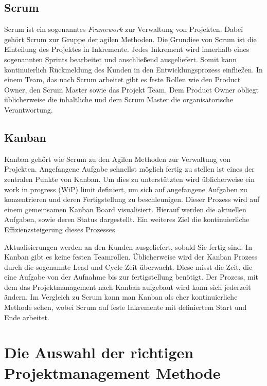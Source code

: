 \documentclass[twocolumn,10pt]{asme2ej}
\begin{document}
\subsection{Scrum}
Scrum ist ein sogenanntes \emph{Framework} zur Verwaltung von Projekten. Dabei gehört Scrum zur Gruppe der agilen Methoden. Die Grundiee von Scrum ist die Einteilung des Projektes in Inkremente. Jedes Inkrement wird innerhalb eines sogenannten Sprints bearbeitet und anschließend ausgeliefert. Somit kann kontinuierlich Rückmeldung des Kunden in den Entwicklungsprozess einfließen. In einem Team, das nach Scrum arbeitet gibt es feste Rollen wie den Product Owner, den Scrum Master sowie das Projekt Team. Dem Product Owner obliegt üblicherweise die inhaltliche und dem Scrum Master die organisatorische Verantwortung.

\subsection{Kanban}
Kanban gehört wie Scrum zu den Agilen Methoden zur Verwaltung von Projekten. Angefangene Aufgabe schnellst möglich fertig zu stellen ist eines der zentralen Punkte von Kanban. Um dies zu unterstützten wird üblicherweise ein work in progress (WiP) limit definiert, um sich auf angefangene Aufgaben zu konzentrieren und deren Fertigstellung zu beschleunigen. Dieser Prozess wird auf einem gemeinsamen Kanban Board visualisiert. Hierauf werden die aktuellen Aufgaben, sowie deren Status dargestellt. Ein weiteres Ziel die kontinuierliche Effizienzsteigerung dieses Prozesses.\cite{kanban}


Aktualisierungen werden an den Kunden ausgeliefert, sobald Sie fertig sind. In Kanban gibt es keine festen Teamrollen. Üblicherweise wird der Kanban Prozess durch die sogenannte Lead und Cycle Zeit überwacht. Diese misst die Zeit, die eine Aufgabe von der Aufnahme bis zur fertigstellung benötigt. Der Prozess, mit dem das Projektmanagement nach Kanban aufgebaut wird kann sich jederzeit ändern. Im Vergleich zu Scrum kann man Kanban als eher kontinuierliche Methode sehen, wobei Scrum auf feste Inkremente mit definiertem Start und Ende arbeitet.

\section{Die Auswahl der richtigen Projektmanagement Methode}
\end{document}
